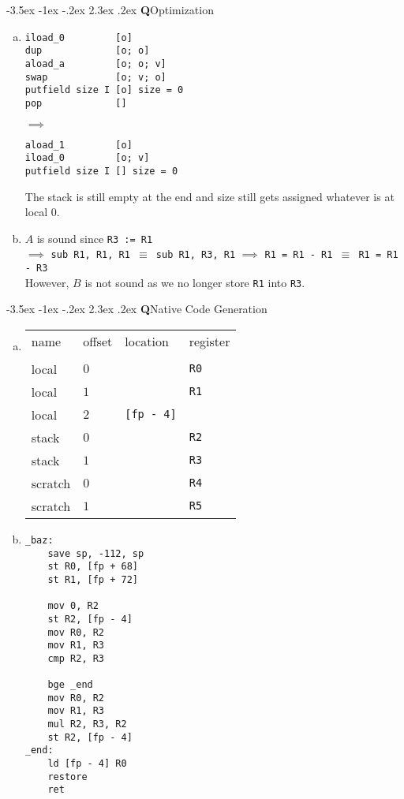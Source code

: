 \documentclass[12pt]{article}
\makeatletter
\renewcommand\section{\@startsection{section}{1}{\z@}%
  {-3.5ex \@plus -1ex \@minus -.2ex}%
                                       {2.3ex \@plus.2ex}%
                                       {\normalfont\bfseries Q}}
\makeatother
\begin{document}
\section{Optimization}
\begin{enumerate}[(a)]
\item
  \begin{minipage}{0.5\linewidth}
\begin{verbatim}
iload_0         [o]
dup             [o; o]
aload_a         [o; o; v]
swap            [o; v; o]
putfield size I [o] size = 0
pop             []
\end{verbatim}
  \end{minipage}
  $\implies$ \hspace{5 em}
  \begin{minipage}{0.5\linewidth}
\begin{verbatim}
aload_1         [o]
iload_0         [o; v]
putfield size I [] size = 0
\end{verbatim}
  \end{minipage}
  The stack is still empty at the end and size still gets assigned
  whatever is at local $0$.

\item $A$ is sound since \texttt{R3 := R1}
  \\$\implies$ \texttt{sub R1,
    R1, R1 $\equiv$ sub R1, R3, R1} $\implies$ \texttt{R1 = R1 - R1 $\equiv$ R1 = R1
    - R3}
  \\ However, $B$ is not sound as we no longer store \texttt{R1} into \texttt{R3}.
\end{enumerate}

\section{Native Code Generation}
\begin{enumerate}[(a)]
\item
\begin{tabular}{l l l l}
  name&offset&location&register
  \\
  \\ local & $0$ & & \texttt{R0}
  \\ local & $1$ & & \texttt{R1}
  \\ local & $2$ & \texttt{[fp - 4]}
  \\ stack & $0$ & & \texttt{R2}
  \\ stack & $1$ & & \texttt{R3}
  \\ scratch & $0$ & & \texttt{R4}
  \\ scratch & $1$ & & \texttt{R5}
\end{tabular}
\item
\begin{verbatim}
_baz:
    save sp, -112, sp
    st R0, [fp + 68]
    st R1, [fp + 72]

    mov 0, R2
    st R2, [fp - 4]
    mov R0, R2
    mov R1, R3
    cmp R2, R3

    bge _end
    mov R0, R2
    mov R1, R3
    mul R2, R3, R2
    st R2, [fp - 4]
_end:
    ld [fp - 4] R0
    restore
    ret
\end{verbatim}
\end{enumerate}
\end{document}
